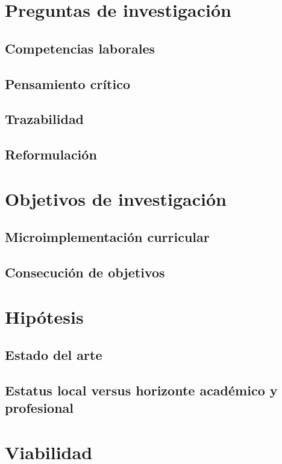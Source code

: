 \documentclass[12pt,letterpaper,article,x11names]{memoir}
\begin{document}
\section{Preguntas de investigación}
\label{sec:org363d659}
\subsection{Competencias laborales}
\label{sec:orgce739f9}
\subsection{Pensamiento crítico}
\label{sec:org053b9ce}
\subsection{Trazabilidad}
\label{sec:org14820d3}
\subsection{Reformulación}
\label{sec:org42e26c3}
\section{Objetivos de investigación}
\label{sec:orgd2411d0}
\subsection{Microimplementación curricular}
\label{sec:orgdfdb16c}
\subsection{Consecución de objetivos}
\label{sec:orgac0154b}
\section{Hipótesis}
\label{sec:org9fdab52}
\subsection{Estado del arte}
\label{sec:org80f4ea7}
\subsection{Estatus local versus horizonte académico y profesional}
\label{sec:org2da1744}
\section{Viabilidad}
\label{sec:orgc2a5022}
\end{document}

